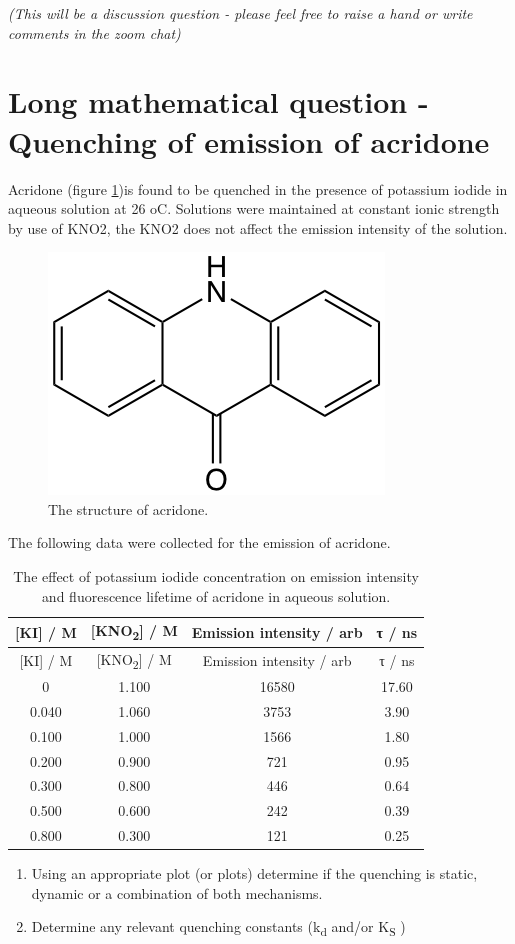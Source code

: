\documentclass[
]{book}
\begin{document}
\emph{(This will be a discussion question - please feel free to raise a hand or write comments in the zoom chat)}

\hypertarget{sec:acridone}{%
\section{Long mathematical question - Quenching of emission of acridone}\label{sec:acridone}}

Acridone (figure \ref{fig:acridone})is found to be quenched in the presence of potassium iodide in aqueous solution at 26 oC. Solutions were maintained at constant ionic strength by use of KNO2, the KNO2 does not affect the emission intensity of the solution.

\begin{figure}

{\centering \includegraphics[width=0.3\linewidth]{images/acridone} 

}

\caption{The structure of acridone.}\label{fig:acridone}
\end{figure}

The following data were collected for the emission of acridone.

\begin{longtable}[]{@{}cccc@{}}
\caption{\label{tab:acridonequench} The effect of potassium iodide concentration on emission intensity and fluorescence lifetime of acridone in aqueous solution.}\tabularnewline
\toprule
{[}KI{]} / M & {[}KNO\textsubscript{2}{]} / M & Emission intensity / arb & τ / ns\tabularnewline
\midrule
\endfirsthead
\toprule
{[}KI{]} / M & {[}KNO\textsubscript{2}{]} / M & Emission intensity / arb & τ / ns\tabularnewline
\midrule
\endhead
0 & 1.100 & 16580 & 17.60\tabularnewline
0.040 & 1.060 & 3753 & 3.90\tabularnewline
0.100 & 1.000 & 1566 & 1.80\tabularnewline
0.200 & 0.900 & 721 & 0.95\tabularnewline
0.300 & 0.800 & 446 & 0.64\tabularnewline
0.500 & 0.600 & 242 & 0.39\tabularnewline
0.800 & 0.300 & 121 & 0.25\tabularnewline
\bottomrule
\end{longtable}

\begin{enumerate}
\def\labelenumi{\arabic{enumi}.}
\item
  Using an appropriate plot (or plots) determine if the quenching is static, dynamic or a combination of both mechanisms.
\item
  Determine any relevant quenching constants (k\textsubscript{d} and/or K\textsubscript{S} )
\end{enumerate}
\end{document}

